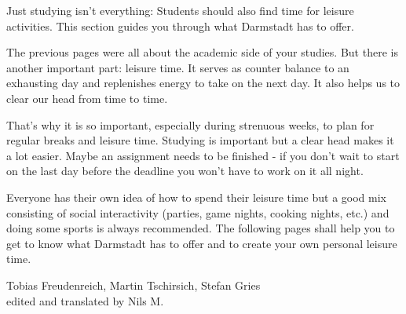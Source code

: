 {Just studying isn't everything: Students should also find time for leisure activities. This section guides you through what Darmstadt has to offer.
}{
    The previous pages were all about the academic side of your studies. But there is another important part: leisure time. It serves as counter balance to an exhausting day and replenishes energy to take on the next day. It also helps us to clear our head from time to time.

    That's why it is so important, especially during strenuous weeks, to plan for regular breaks and leisure time. Studying is important but a clear head makes it a lot easier. Maybe an assignment needs to be finished - if you don't wait to start on the last day before the deadline you won't have to work on it all night.

    Everyone has their own idea of how to spend their leisure time but a good mix consisting of social interactivity (parties, game nights, cooking nights, etc.) and doing some sports is always recommended. The following pages shall help you to get to know what Darmstadt has to offer and to create your own personal leisure time.
}
{Tobias Freudenreich, Martin Tschirsich, Stefan Gries \\ edited and translated by Nils M.}
